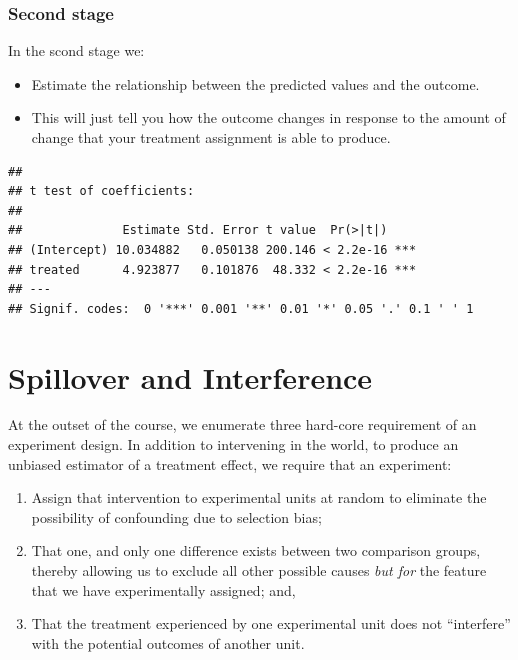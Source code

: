 \documentclass[
]{book}
\providecommand{\tightlist}{%
  \setlength{\itemsep}{0pt}\setlength{\parskip}{0pt}}
\begin{document}
\hypertarget{second-stage}{%
\subsection{Second stage}\label{second-stage}}

In the scond stage we:

\begin{itemize}
\tightlist
\item
  Estimate the relationship between the predicted values and the
  outcome.
\item
  This will just tell you how the outcome changes in response to the
  amount of change that your treatment assignment is able to produce.
\end{itemize}

\begin{verbatim}
## 
## t test of coefficients:
## 
##              Estimate Std. Error t value  Pr(>|t|)    
## (Intercept) 10.034882   0.050138 200.146 < 2.2e-16 ***
## treated      4.923877   0.101876  48.332 < 2.2e-16 ***
## ---
## Signif. codes:  0 '***' 0.001 '**' 0.01 '*' 0.05 '.' 0.1 ' ' 1
\end{verbatim}

\hypertarget{spillover-and-interference}{%
\chapter{Spillover and Interference}\label{spillover-and-interference}}

At the outset of the course, we enumerate three hard-core requirement of
an experiment design. In addition to intervening in the world, to
produce an unbiased estimator of a treatment effect, we require that an
experiment:

\begin{enumerate}
\def\labelenumi{\arabic{enumi}.}
\tightlist
\item
  Assign that intervention to experimental units at random to eliminate
  the possibility of confounding due to selection bias;
\item
  That one, and only one difference exists between two comparison
  groups, thereby allowing us to exclude all other possible causes
  \emph{but for} the feature that we have experimentally assigned; and,
\item
  That the treatment experienced by one experimental unit does not
  ``interfere'' with the potential outcomes of another unit.
\end{enumerate}
\end{document}
